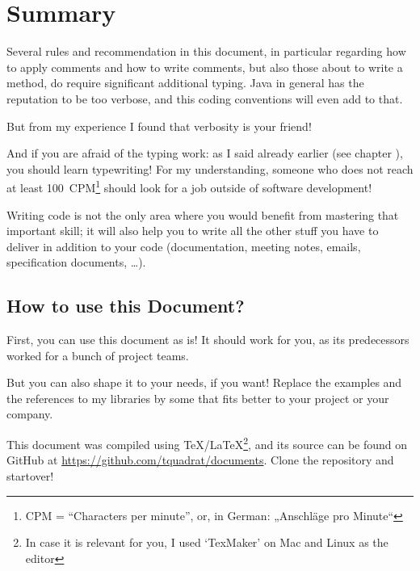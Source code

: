 \chapter{Summary}
Several rules and recommendation in this document, in particular regarding how to apply comments and how to write comments, but also those about to write a method, do require significant additional typing. Java in general has the reputation to be too verbose, and this coding conventions will even add to that.

But from my experience I found that verbosity is your friend!

And if you are afraid of the typing work: as I said already earlier (see chapter ), you should learn typewriting! For my understanding, someone who does not reach at least 100~CPM\footnote{CPM = “Characters per minute”, or, in German: „Anschläge pro Minute“} should look for a job outside of software development!

Writing code is not the only area where you would benefit from mastering that important skill; it will also help you to write all the other stuff you have to deliver in addition to your code (documentation, meeting notes, emails, specification documents, …).

\section{How to use this Document?}
First, you can use this document as is! It should work for you, as its predecessors worked for a bunch of project teams.

But you can also shape it to your needs, if you want! Replace the examples and the references to my libraries by some that fits better to your project or your company.

This document was compiled using \TeX/\LaTeX\footnote{In case it is relevant for you, I used ‘TexMaker’ on Mac and Linux as the editor}, and its source can be found on GitHub at \href{https://github.com/tquadrat/documents}{https://github.com/tquadrat/documents}. Clone the repository and startover!
